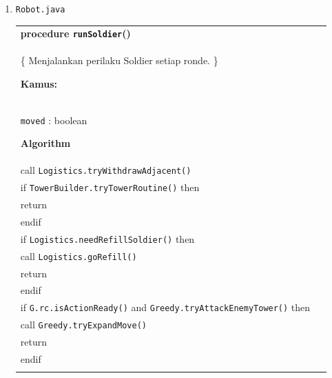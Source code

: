 \documentclass{article}
\newenvironment{pseudobox}
{
\centering
\begin{longtable}{|p{0.94\linewidth}|}
\hline
}
{
\\ \hline
\end{longtable}
\vspace{0.05cm}
}
\begin{document}
\begin{enumerate}[label=\alph*.]
\begin{enumerate}[label=\alph*.]
\begin{pseudobox}
\hspace*{1.5em}if \texttt{G.rc.canSenseLocation(loc)} then \\
\hspace*{3em}return \texttt{G.rc.senseMapInfo(loc)} \\
\hspace*{1.5em}else \\
\hspace*{3em}return null \\
\hspace*{1.5em}endif
\end{pseudobox}

\item \texttt{Robot.java}

\begin{pseudobox}
\textbf{procedure \texttt{runSoldier}()} \\
\{ Menjalankan perilaku Soldier setiap ronde. \}

\textbf{Kamus:} \\
\hspace*{1.5em}\texttt{moved} : boolean

\textbf{Algorithm} \\
\hspace*{1.5em}call \texttt{Logistics.tryWithdrawAdjacent()} \\

\hspace*{1.5em}if \texttt{TowerBuilder.tryTowerRoutine()} then \\
\hspace*{3em}return \\
\hspace*{1.5em}endif \\

\hspace*{1.5em}if \texttt{Logistics.needRefillSoldier()} then \\
\hspace*{3em}call \texttt{Logistics.goRefill()} \\
\hspace*{3em}return \\
\hspace*{1.5em}endif \\

\hspace*{1.5em}if \texttt{G.rc.isActionReady()} and \texttt{Greedy.tryAttackEnemyTower()} then \\
\hspace*{3em}call \texttt{Greedy.tryExpandMove()} \\
\hspace*{3em}return \\
\hspace*{1.5em}endif \\


\end{pseudobox}
\end{enumerate}
\end{enumerate}
\end{document}
